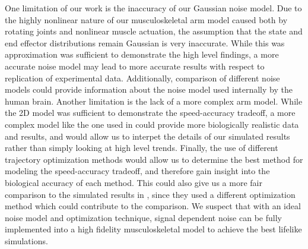 \documentclass[letterpaper, 10pt, conference]{ieeeconf}
\begin{document}
\par One limitation of our work is the inaccuracy of our Gaussian noise model. Due to the highly nonlinear nature of our musculoskeletal arm model caused both by rotating joints and nonlinear muscle actuation, the assumption that the state and end effector distributions remain Gaussian is very inaccurate. While this was approximation was sufficient to demonstrate the high level findings, a more accurate noise model may lead to more accurate results with respect to replication of experimental data. Additionally, comparison of different noise models could provide information about the noise model used internally by the human brain. Another limitation is the lack of a more complex arm model. While the 2D model was sufficient to demonstrate the speed-accuracy tradeoff, a more complex model like the one used in \cite{original_paper_high_fidelity} could provide more biologically realistic data and results, and would allow us to interpet the details of our simulated results rather than simply looking at high level trends. Finally, the use of different trajectory optimization methods would allow us to determine the best method for modeling the speed-accuracy tradeoff, and therefore gain insight into the biological accuracy of each method. This could also give us a more fair comparison to the simulated results in \cite{original_paper_high_fidelity}, since they used a different optimization method which could contribute to the comparison. We suspect that with an ideal noise model and optimization technique, signal dependent noise can be fully implemented into a high fidelity musculoskeletal model to achieve the best lifelike simulations.


% 



\end{document}

